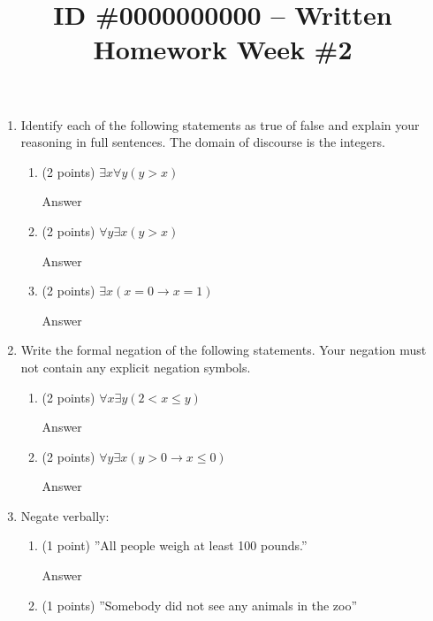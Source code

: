 \documentclass{article}
\title{ID \#0000000000 – Written Homework Week \#2}
\begin{document}
\maketitle

\begin{enumerate}
     \item Identify each of the following statements as true of false and explain your reasoning in full sentences. The domain of discourse is the integers.
     \begin{enumerate}
        \item (2 points) $\exists x\forall y(y > x)$
        
        \color{blue}
            Answer
        \color{black}
        
        \item (2 points) $\forall y\exists x(y > x)$
        
        \color{blue}
            Answer
        \color{black}
        
        \item (2 points) $\exists x(x = 0 \rightarrow x = 1)$
        
        \color{blue}
            Answer
        \color{black}
     \end{enumerate}
     
    \item Write the formal negation of the following statements. Your negation must not contain any explicit negation symbols.
    \begin{enumerate}
        \item (2 points) $\forall x\exists y(2 < x \leq y)$
        
        \color{blue}
            Answer
        \color{black}
        
        \item (2 points) $\forall y\exists x(y > 0 \rightarrow x \leq 0)$
        
        \color{blue}
            Answer
        \color{black}
    \end{enumerate}
    
    \item Negate verbally:
        \begin{enumerate}
            \item (1 point) ”All people weigh at least 100 pounds.”
        
            \color{blue}
                Answer
            \color{black}
        
            \item (1 points) ”Somebody did not see any animals in the zoo”
        

\end{enumerate}
\end{enumerate}
\end{document}
